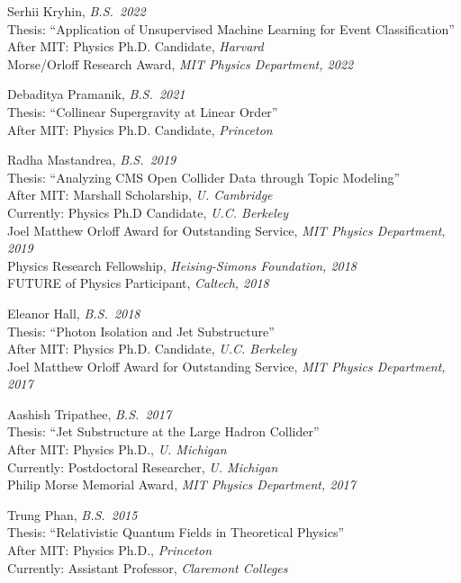 \bbl

\item Serhii Kryhin, \emph{B.S.~2022}
\\ Thesis: ``Application of Unsupervised Machine Learning for Event Classification''
\\ After MIT: Physics Ph.D. Candidate, \emph{Harvard}
\\ Morse/Orloff Research Award, \emph{MIT Physics Department, 2022}

\item Debaditya Pramanik, \emph{B.S.~2021}
\\ Thesis: ``Collinear Supergravity at Linear Order''
\\ After MIT: Physics Ph.D. Candidate, \emph{Princeton}

\item Radha Mastandrea, \emph{B.S.~2019}
\\ Thesis: ``Analyzing CMS Open Collider Data through Topic Modeling''
\\ After MIT: Marshall Scholarship, \emph{U. Cambridge}
\\ Currently: Physics Ph.D Candidate, \emph{U.C. Berkeley}
\\ Joel Matthew Orloff Award for Outstanding Service, \emph{MIT Physics Department, 2019}
\\ Physics Research Fellowship, \emph{Heising-Simons Foundation, 2018}
\\ FUTURE of Physics Participant, \emph{Caltech, 2018}

\item Eleanor Hall, \emph{B.S.~2018}
\\ Thesis: ``Photon Isolation and Jet Substructure''
\\ After MIT: Physics Ph.D. Candidate, \emph{U.C. Berkeley}
\\ Joel Matthew Orloff Award for Outstanding Service, \emph{MIT Physics Department, 2017}

\item Aashish Tripathee, \emph{B.S.~2017}
\\ Thesis: ``Jet Substructure at the Large Hadron Collider''
\\ After MIT: Physics Ph.D., \emph{U. Michigan}
\\ Currently: Postdoctoral Researcher, \emph{U. Michigan}
\\ Philip Morse Memorial Award, \emph{MIT Physics Department, 2017}

\item Trung Phan, \emph{B.S.~2015}
\\ Thesis: ``Relativistic Quantum Fields in Theoretical Physics''
\\ After MIT: Physics Ph.D., \emph{Princeton}
\\ Currently: Assistant Professor, \emph{Claremont Colleges}

